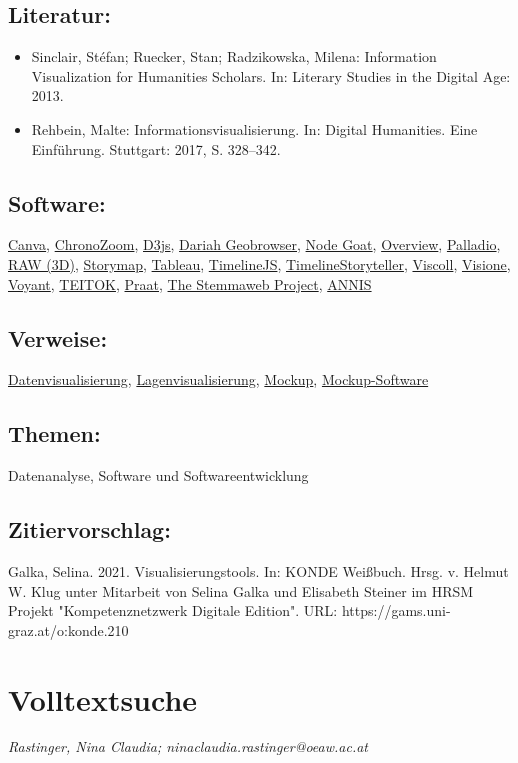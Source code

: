 \documentclass{article}
\begin{document}
        \subsection*{Literatur:}\begin{itemize}\item Sinclair, Stéfan; Ruecker, Stan; Radzikowska, Milena: Information Visualization for Humanities Scholars. In: Literary Studies in the Digital Age: 2013.\item Rehbein, Malte: Informationsvisualisierung. In: Digital Humanities. Eine Einführung. Stuttgart: 2017, S. 328–342.\end{itemize}\subsection*{Software:}\href{https://www.canva.com/}{Canva}, \href{http://www.chronozoomproject.org/}{ChronoZoom}, \href{https://d3js.org}{D3js}, \href{https://geobrowser.de.dariah.eu/}{Dariah Geobrowser}, \href{https://nodegoat.net/}{Node Goat}, \href{https://www.overviewdocs.com/}{Overview}, \href{http://hdlab.stanford.edu/palladio/}{Palladio}, \href{https://rawgraphs.io/}{RAW (3D)}, \href{https://storymap.knightlab.com/}{Storymap}, \href{https://public.tableau.com/s/}{Tableau}, \href{http://timeline.knightlab.com/}{TimelineJS}, \href{https://timelinestoryteller.com/app/}{TimelineStoryteller}, \href{https://github.com/leoba/VisColl}{Viscoll}, \href{https://visone.info/}{Visione}, \href{https://voyant-tools.org/}{Voyant}, \href{http://www.teitok.org/index.php?action=about}{TEITOK}, \href{http://www.fon.hum.uva.nl/praat/}{Praat}, \href{https://stemmaweb.net/}{The Stemmaweb Project}, \href{http://corpus-tools.org/annis/}{ANNIS}\subsection*{Verweise:}\href{https://gams.uni-graz.at/o:konde.54}{Datenvisualisierung}, \href{https://gams.uni-graz.at/o:konde.113}{Lagenvisualisierung}, \href{https://gams.uni-graz.at/o:konde.135}{Mockup}, \href{https://gams.uni-graz.at/o:konde.136}{Mockup-Software}\subsection*{Themen:}Datenanalyse, Software und Softwareentwicklung\subsection*{Zitiervorschlag:}Galka, Selina. 2021. Visualisierungstools. In: KONDE Weißbuch. Hrsg. v. Helmut W. Klug unter Mitarbeit von Selina Galka und Elisabeth Steiner im HRSM Projekt "Kompetenznetzwerk Digitale Edition". URL: https://gams.uni-graz.at/o:konde.210\newpage\section*{Volltextsuche} \emph{Rastinger, Nina Claudia; ninaclaudia.rastinger@oeaw.ac.at }\\
        
\end{document}
